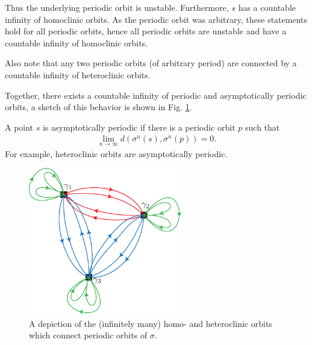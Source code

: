 Thus the underlying periodic orbit is unstable. Furthermore, $s$ has a countable infinity of homoclinic orbits. As the periodic orbit was arbitrary, these statements hold for all periodic orbits, hence all periodic orbits are unstable and have a countable infinity of homoclinic orbits.

\begin{remark}[]
Also note that any two periodic orbits (of arbitrary period) are connected by a countable infinity of heteroclinic orbits.
\end{remark}
Together, there exists a countable infinity of periodic and asymptotically periodic orbits, a sketch of this behavior is shown in Fig. \ref{fig:crazy_orbits}.
\begin{definition}
	A point $s$ is asymptotically periodic if there is a periodic orbit $p$ such that 
	\begin{align}
		\boxed{
			\lim_{n\to \infty } d(\sigma^{n}(s), \sigma^{n}(p))=0.
		}
	\end{align}
For example, heteroclinic orbits are asymptotically periodic.
\end{definition}

\begin{figure}[h!]
	\centering
	\includegraphics[width=0.6\textwidth]{figures/ch6/21crazy_orbits.pdf}
	\caption{A depiction of the (infinitely many) homo- and heteroclinic orbits which connect periodic orbits of $\sigma $.}
	\label{fig:crazy_orbits}
\end{figure}

